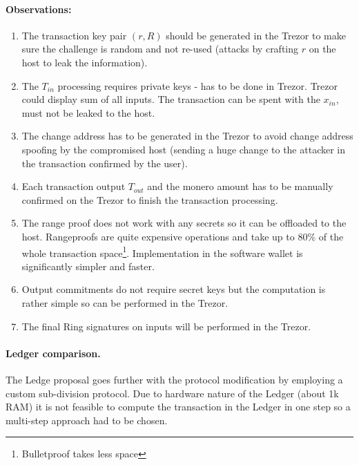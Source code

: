 \documentclass[]{article}
\begin{document}
\paragraph{Observations:}
\begin{enumerate}
	\item The transaction key pair $(r,R)$ should be generated in the Trezor to make sure the challenge is random and not re-used (attacks by crafting $r$ on the host to leak the information). 
	
	\item The $T_{in}$ processing requires private keys - has to be done in Trezor. Trezor could display sum of all inputs. The transaction can be spent with the $x_{in}$, must not be leaked to the host.
	
	\item The change address has to be generated in the Trezor to avoid change address spoofing by the compromised host (sending a huge change to the attacker in the transaction confirmed by the user).
	
	\item Each transaction output $T_{out}$ and the monero amount has to be manually confirmed on the Trezor to finish the transaction processing.
	
	\item The range proof does not work with any secrets so it can be offloaded to the host. Rangeproofs are quite expensive operations and take up to 80\% of the whole transaction space\footnote{Bulletproof takes less space}. Implementation in the software wallet is significantly simpler and faster.
	
	\item Output commitments do not require secret keys but the computation is rather simple so can be performed in the Trezor.
	
	\item The final Ring signatures on inputs will be performed in the Trezor.
\end{enumerate}

\paragraph{Ledger comparison.} The Ledge proposal \cite{ledger_doc} goes further with the protocol modification by employing a custom sub-division protocol. Due to hardware nature of the Ledger (about 1k RAM) it is not feasible to compute the transaction in the Ledger in one step so a multi-step approach had to be chosen.
\end{document}
